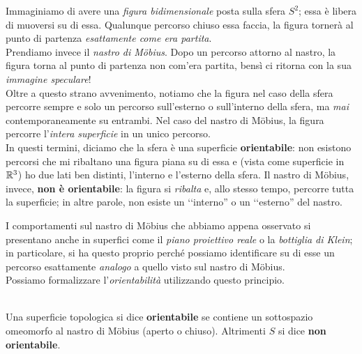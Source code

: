 \begin{intuit}
	Immaginiamo di avere una \textit{figura bidimensionale} posta sulla sfera $S^2$; essa è libera di muoversi su di essa. Qualunque percorso chiuso essa faccia, la figura tornerà al punto di partenza \textit{esattamente come era partita}.\\
	Prendiamo invece il \textit{nastro di Möbius}. Dopo un percorso attorno al nastro, la figura torna al punto di partenza non com'era partita, bensì ci ritorna con la sua \textit{immagine speculare}!\\
	Oltre a questo strano avvenimento, notiamo che la figura nel caso della sfera percorre sempre e solo un percorso sull'esterno o sull'interno della sfera, ma \textit{mai} contemporaneamente su entrambi. Nel caso del nastro di Möbius, la figura percorre l'\textit{intera superficie} in un unico percorso.\\
	In questi termini, diciamo che la sfera è una superficie \textbf{orientabile}: non esistono percorsi che mi ribaltano una figura piana su di essa e (vista come superficie in $\mathbb{R}^3$) ho due lati ben distinti, l'interno e l'esterno della sfera. Il nastro di Möbius, invece, \textbf{non è orientabile}: la figura si \textit{ribalta} e, allo stesso tempo, percorre tutta la superficie; in altre parole, non esiste un ‘‘interno'' o un ‘‘esterno'' del nastro.
\end{intuit}
I comportamenti sul nastro di Möbius che abbiamo appena osservato si presentano anche in superfici come il \textit{piano proiettivo reale} o la \textit{bottiglia di Klein}; in particolare, si ha questo proprio perché possiamo identificare su di esse un percorso esattamente \textit{analogo} a quello visto sul nastro di Möbius.\\
Possiamo formalizzare l'\textit{orientabilità} utilizzando questo principio.
\begin{define}[Orientabilità.]~{}\\
	Una superficie topologica si dice \textbf{orientabile} se contiene un sottospazio omeomorfo al nastro di Möbius (aperto o chiuso). Altrimenti $S$ si dice \textbf{non orientabile}.
\end{define}
